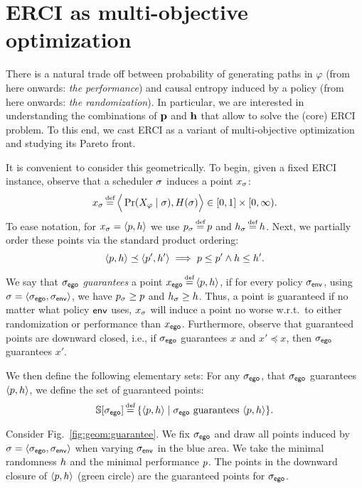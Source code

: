 \section{ERCI as multi-objective optimization}\label{sec:convex}
There is a natural trade off
between probability of generating paths in $\varphi$ (from here
onwards: \emph{the performance}) and causal entropy induced by a
policy (from here onwards: \emph{the randomization}).  In particular,
we are interested in understanding the combinations of $\mathbf{p}$
and $\mathbf{h}$ that allow to solve the (core) ERCI problem. To this
end, we cast ERCI as a variant of multi-objective optimization and
studying its Pareto front.

It is convenient to consider this geometrically.
To begin, given a fixed ERCI instance, observe that a scheduler $\sigma$
induces a point $x_\sigma$:
\begin{equation}
  x_\sched \eqdef \Big\langle \Pr(X_\varphi \mid \sched), H(\sched) \Big\rangle \in [0,1] \times [0,\infty).  
\end{equation}
To ease notation, for $x_\sigma = \langle p,h \rangle$ we use
$\scp_\sched \eqdef \scp$ and $\rndp_\sched \eqdef \rndp$. Next, we
partially order these points via the standard product ordering:
\begin{equation}
  \langle p,h \rangle \preceq \langle p',h' \rangle \implies p \leq p' \wedge h \leq h'.
\end{equation}


We say that ${\sigma_{\mathsf{ego}}}$ \emph{guarantees} a point $x_\pOne \eqdef
\langle \scp, \rndp \rangle$, if for every policy ${\sigma_{\mathsf{env}}}$, using
$\sigma = \langle {\sigma_{\mathsf{ego}}}, {\sigma_{\mathsf{env}}} \rangle$, we have
$p_\sigma \geq p$ and $h_\sigma \geq h$. Thus, a point
is guaranteed if no matter what policy $\mathsf{env}$ uses, $x_\sigma$ will
induce a point no worse w.r.t.\ to either randomization or performance
than $x_{\mathsf{ego}}$. Furthermore, observe that guaranteed points are
downward closed, i.e., if ${\sigma_{\mathsf{ego}}}$ guarantees $x$ and $x' \preceq x$,
then ${\sigma_{\mathsf{ego}}}$ guarantees $x'$.


We then define the following elementary sets: For any ${\sigma_{\mathsf{ego}}}$,
that ${\sigma_{\mathsf{ego}}}$ guarantees $\langle p, h \rangle$, we define
the set of guaranteed points:
\begin{equation}\label{eq:guaranteed}
  \solutions[\pOneSched] \eqdef \{ \langle \scp, \rndp \rangle \mid  \pOneSched \text{ guarantees } \langle \scp, \rndp \rangle \}.
\end{equation}
\begin{example}
Consider Fig.~\ref{fig:geom:guarantee}. We fix ${\sigma_{\mathsf{ego}}}$ and draw all points induced by $\sigma = \langle {\sigma_{\mathsf{ego}}}, {\sigma_{\mathsf{env}}} \rangle$ when varying ${\sigma_{\mathsf{env}}}$ in the blue area. We take the minimal randomness $h$ and the minimal performance $p$. The points in the downward closure of $\langle p, h \rangle$ (green circle) are the guaranteed points for ${\sigma_{\mathsf{ego}}}$.	
\end{example}

